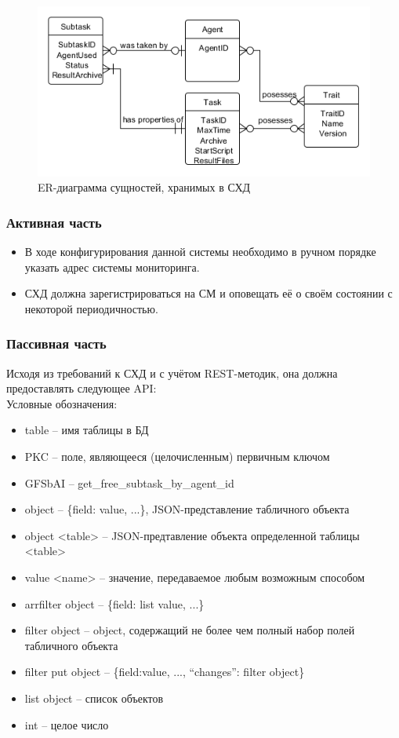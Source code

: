 \documentclass[a4paper,12pt]{report}
\numberwithin{equation}{section}
\begin{document}
\begin{figure}[h!]
  \centering
  \includegraphics[width=.9\linewidth]{diagrams/db/er}
  \caption{ER-диаграмма сущностей, хранимых в СХД}
  \label{fig:db-er}
\end{figure}

\subsubsection{Активная часть}
\begin{itemize}
  \item В ходе конфигурирования данной системы необходимо в ручном порядке указать адрес системы мониторинга.
  \item СХД должна зарегистрироваться на СМ и оповещать её о своём состоянии с некоторой периодичностью.
\end{itemize}

\subsubsection{Пассивная часть}
Исходя из требований к СХД и с учётом REST-методик, она должна предоставлять следующее API:
\\
Условные обозначения:
\begin{itemize}
  \item table -- имя таблицы в БД
  \item PKC -- поле, являющееся (целочисленным) первичным ключом
  \item GFSbAI -- get\_free\_subtask\_by\_agent\_id
  \item object -- \{field: value, ...\}, JSON-представление табличного объекта
  \item object <table> -- JSON-предтавление объекта определенной таблицы <table>
  \item value <name> -- значение, передаваемое любым возможным способом
  \item arrfilter object -- \{field: list value, ...\}
  \item filter object -- object, содержащий не более чем полный набор полей табличного объекта
  \item filter put object -- \{field:value, ..., ``changes'': filter object\}
  \item list object -- список объектов
  \item int -- целое число
\end{itemize}
\end{document}
